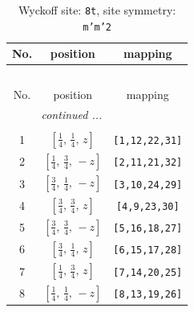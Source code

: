 \documentclass[fleqn,8pt]{jsarticle}
\begin{document}
\begin{longtable}{ccc}
\caption{Wyckoff site: {\tt 8t}, site symmetry: {\tt m'm'2}}
 \\
 \hline \hline
No. & position & mapping \\ \hline \endfirsthead

\multicolumn{2}{l}{\tablename\ \thetable{}} \\
 \hline \hline
No. & position & mapping \\ \hline \endhead

 \hline \hline
\multicolumn{2}{r}{\footnotesize\it continued ...} \\ \endfoot

 \hline \hline
\multicolumn{2}{r}{} \\ \endlastfoot

1 & $\left[ \frac{1}{4},\, \frac{1}{4},\, z \right]$ & {\tt [1,12,22,31]} \\ \hline
2 & $\left[ \frac{1}{4},\, \frac{3}{4},\, - z \right]$ & {\tt [2,11,21,32]} \\ \hline
3 & $\left[ \frac{3}{4},\, \frac{1}{4},\, - z \right]$ & {\tt [3,10,24,29]} \\ \hline
4 & $\left[ \frac{3}{4},\, \frac{3}{4},\, z \right]$ & {\tt [4,9,23,30]} \\ \hline
5 & $\left[ \frac{3}{4},\, \frac{3}{4},\, - z \right]$ & {\tt [5,16,18,27]} \\ \hline
6 & $\left[ \frac{3}{4},\, \frac{1}{4},\, z \right]$ & {\tt [6,15,17,28]} \\ \hline
7 & $\left[ \frac{1}{4},\, \frac{3}{4},\, z \right]$ & {\tt [7,14,20,25]} \\ \hline
8 & $\left[ \frac{1}{4},\, \frac{1}{4},\, - z \right]$ & {\tt [8,13,19,26]} \\
\end{longtable}
\renewcommand{\arraystretch}{1.2}
\end{document}
